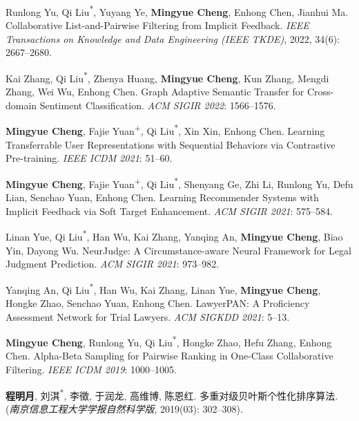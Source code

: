\documentclass[UTF8,fontset=fandol,scheme=plain,11pt,a4paper]{ctexart}
\newcommand{\pubentry}[1]{\item \begin{minipage}[t]{\linewidth}#1\end{minipage}}
\begin{document}
\begin{publist}[start=54]
\pubentry{Runlong Yu, Qi Liu\textsuperscript{*}, Yuyang Ye, \textbf{Mingyue Cheng}, Enhong Chen, Jianhui Ma. Collaborative List-and-Pairwise Filtering from Implicit Feedback. \emph{IEEE Transactions on Knowledge and Data Engineering (IEEE TKDE)}, 2022, 34(6): 2667--2680.}

\pubentry{Kai Zhang, Qi Liu\textsuperscript{*}, Zhenya Huang, \textbf{Mingyue Cheng}, Kun Zhang, Mengdi Zhang, Wei Wu, Enhong Chen. Graph Adaptive Semantic Transfer for Cross-domain Sentiment Classification. \emph{ACM SIGIR 2022}: 1566--1576.}

\pubentry{\textbf{Mingyue Cheng}, Fajie Yuan\textsuperscript{+}, Qi Liu\textsuperscript{*}, Xin Xin, Enhong Chen. Learning Transferrable User Representations with Sequential Behaviors via Contrastive Pre-training. \emph{IEEE ICDM 2021}: 51--60.}

\pubentry{\textbf{Mingyue Cheng}, Fajie Yuan\textsuperscript{+}, Qi Liu\textsuperscript{*}, Shenyang Ge, Zhi Li, Runlong Yu, Defu Lian, Senchao Yuan, Enhong Chen. Learning Recommender Systems with Implicit Feedback via Soft Target Enhancement. \emph{ACM SIGIR 2021}: 575--584.}

\pubentry{Linan Yue, Qi Liu\textsuperscript{*}, Han Wu, Kai Zhang, Yanqing An, \textbf{Mingyue Cheng}, Biao Yin, Dayong Wu. NeurJudge: A Circumstance-aware Neural Framework for Legal Judgment Prediction. \emph{ACM SIGIR 2021}: 973--982.}

\pubentry{Yanqing An, Qi Liu\textsuperscript{*}, Han Wu, Kai Zhang, Linan Yue, \textbf{Mingyue Cheng}, Hongke Zhao, Senchao Yuan, Enhong Chen. LawyerPAN: A Proficiency Assessment Network for Trial Lawyers. \emph{ACM SIGKDD 2021}: 5--13.}

\pubentry{\textbf{Mingyue Cheng}, Runlong Yu, Qi Liu\textsuperscript{*}, Hongke Zhao, Hefu Zhang, Enhong Chen. Alpha-Beta Sampling for Pairwise Ranking in One-Class Collaborative Filtering. \emph{IEEE ICDM 2019}: 1000--1005.}

\pubentry{\textbf{程明月}, 刘淇\textsuperscript{*}, 李徵, 于润龙, 高维博, 陈恩红. 多重对级贝叶斯个性化排序算法. (\emph{南京信息工程大学学报自然科学版}, 2019(03): 302--308).}

\end{publist}
\end{document}
